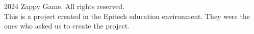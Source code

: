 \documentclass{article}
\begin{document}
\footer
    \begin{minipage}{\textwidth}
        \small \textcopyright{} 2024 Zappy Game. All rights reserved. \\
        \small This is a project created in the Epitech education environment.
        \small They were the ones who asked us to create the project.
    \end{minipage}
\endfooter
\end{document}
